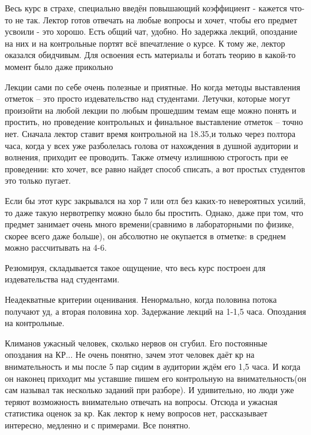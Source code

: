            \begin{commentbox} 
                Весь курс в страхе, специально введён повышающий коэффициент - кажется что-то не так. Лектор готов отвечать на любые вопросы и хочет, чтобы его предмет усвоили - это хорошо. Есть общий чат, удобно. Но задержка лекций, опоздание на них и на контрольные портят всё впечатление о курсе. К тому же, лектор оказался обидчивым. Для освоения есть материалы и ботать теорию в какой-то момент было даже прикольно 
            \end{commentbox} 
        
            \begin{commentbox} 
                Лекции сами по себе очень полезные и приятные. Но когда методы выставления отметок – это просто издевательство над студентами. Летучки, которые могут произойти на любой лекции по любым прошедшим темам еще можно понять и простить, но проведение контрольных и финальное выставление отметок – точно нет. Сначала лектор ставит время контрольной на 18.35,и только через полтора часа, когда у всех уже разболелась голова от нахождения в душной аудитории и волнения, приходит ее проводить. Также отмечу излишнюю строгость при ее проведении: кто хочет, все равно найдет способ списать, а вот простых студентов это только пугает.  

                Если бы этот курс закрывался на хор 7 или отл без каких-то невероятных усилий, то даже такую нервотрепку можно было бы простить. Однако, даже при том, что предмет занимает очень много времени(сравнимо в лабораторными по физике, скорее всего даже больше), он абсолютно не окупается в отметке: в среднем можно рассчитывать на 4-6.
        
                Резюмируя, складывается такое ощущение, что весь курс построен для издевательства над студентами. 
            \end{commentbox} 
        
            \begin{commentbox} 
                Неадекватные критерии оценивания. Ненормально, когда половина потока получают уд, а вторая половина хор. Задержание лекций на 1-1,5 часа. Опоздания на контрольные.  
            \end{commentbox} 
        
            \begin{commentbox} 
                Климанов ужасный человек, сколько нервов он сгубил. Его постоянные опоздания на КР... Не очень понятно, зачем этот человек даёт кр на внимательность и мы после 5 пар сидим в аудитории ждём его 1,5 часа. И когда он наконец приходит мы уставшие пишем его контрольную на внимательность(он сам называл так несколько заданий при разборе). И удивительно, но люди уже теряют возможность внимательно отвечать на вопросы. Отсюда и ужасная статистика оценок за кр. Как лектор к нему вопросов нет, рассказывает интересно, медленно и с примерами. Все понятно. 
            \end{commentbox} 
        

